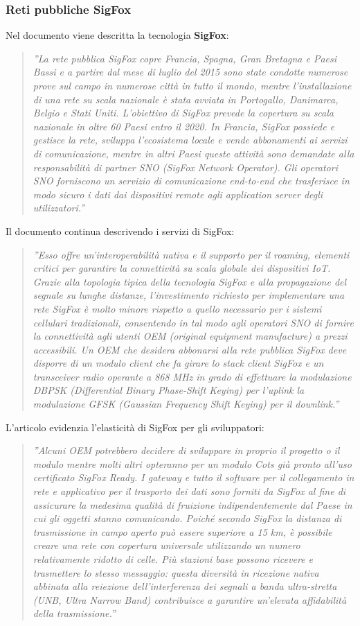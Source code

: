 \documentclass[a4paper]{report} %
\begin{document}
\subsubsection{Reti pubbliche SigFox}
Nel documento \cite{art:rif.23} viene descritta la tecnologia \textbf{SigFox}:
\begin{quote}
	\textit{''La rete pubblica SigFox copre Francia, Spagna, Gran Bretagna e Paesi Bassi e a partire dal mese di luglio del 2015 sono state condotte numerose prove sul campo in numerose città in tutto il mondo, mentre l'installazione di una rete su scala nazionale è stata avviata in Portogallo, Danimarca, Belgio e Stati Uniti. L'obiettivo di SigFox prevede la copertura su scala nazionale in oltre 60 Paesi entro il 2020. In Francia, SigFox possiede e gestisce la rete, sviluppa l'ecosistema locale e vende abbonamenti ai servizi di comunicazione, mentre in altri Paesi queste attività sono demandate alla responsabilità di partner SNO (SigFox Network Operator). Gli operatori SNO forniscono un servizio di comunicazione end-to-end che trasferisce in modo sicuro i dati dai dispositivi remote agli application server degli utilizzatori.''}
\end{quote}
Il documento continua descrivendo i servizi di SigFox:
\begin{quote}	
	\textit{''Esso offre un'interoperabilità nativa e il supporto per il roaming, elementi critici per garantire la connettività su scala globale dei dispositivi IoT. Grazie alla topologia tipica della tecnologia SigFox e alla propagazione del segnale su lunghe distanze, l'investimento richiesto per implementare una rete SigFox è molto minore rispetto a quello necessario per i sistemi cellulari tradizionali, consentendo in tal modo agli operatori SNO di fornire la connettività agli utenti OEM (original equipment manufacture) a prezzi accessibili. Un OEM che desidera abbonarsi alla rete pubblica SigFox deve disporre di un modulo client che fa girare lo stack client SigFox e un transceiver radio operante a 868 MHz in grado di effettuare la modulazione DBPSK (Differential Binary Phase-Shift Keying) per l'uplink la modulazione GFSK (Gaussian Frequency Shift Keying) per il downlink.''} 
\end{quote}
L'articolo \cite{art:rif.23} evidenzia l'elasticità di SigFox per gli sviluppatori:
\begin{quote}	
	\textit{''Alcuni OEM potrebbero decidere di sviluppare in proprio il progetto o il modulo mentre molti altri opteranno per un modulo Cots già pronto all'uso certificato SigFox Ready. I gateway e tutto il software per il collegamento in rete e applicativo per il trasporto dei dati sono forniti da SigFox al fine di assicurare la medesima qualità di fruizione indipendentemente dal Paese in cui gli oggetti stanno comunicando. Poiché secondo SigFox la distanza di trasmissione in campo aperto può essere superiore a 15 km, è possibile creare una rete con copertura universale utilizzando un numero relativamente ridotto di celle. Più stazioni base possono ricevere e trasmettere lo stesso messaggio: questa diversità in ricezione nativa abbinata alla reiezione dell'interferenza dei segnali a banda ultra-stretta (UNB, Ultra Narrow Band) contribuisce a garantire un'elevata affidabilità della trasmissione.''}  %
\end{quote}
\end{document}
